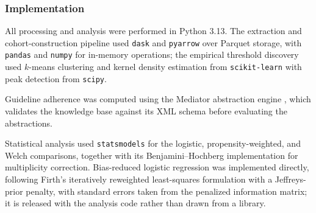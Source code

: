 \subsubsection{Implementation}

All processing and analysis were performed in Python 3.13. The extraction
and cohort-construction pipeline used \texttt{dask} and \texttt{pyarrow}
over Parquet storage, with \texttt{pandas} and \texttt{numpy} for in-memory
operations; the empirical threshold discovery used $k$-means clustering and
kernel density estimation from \texttt{scikit-learn} with peak detection
from \texttt{scipy}.

Guideline adherence was computed using the Mediator abstraction engine
\citep{mediator-github}, which validates the knowledge base against its XML
schema before evaluating the abstractions.

Statistical analysis used \texttt{statsmodels} for the logistic,
propensity-weighted, and Welch comparisons, together with its
Benjamini--Hochberg implementation for multiplicity correction. Bias-reduced
logistic regression was implemented directly, following Firth's iteratively
reweighted least-squares formulation with a Jeffreys-prior penalty, with
standard errors taken from the penalized information matrix; it is released
with the analysis code rather than drawn from a library.

